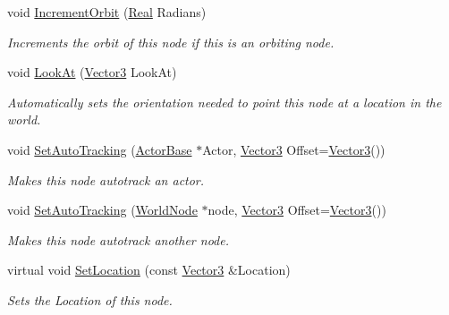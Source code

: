 \begin{DoxyCompactItemize}
void \hyperlink{classMezzanine_1_1WorldNode_a4d09b9262a3d8a4e18bb0ffb5a8eeb2b}{IncrementOrbit} (\hyperlink{namespaceMezzanine_a726731b1a7df72bf3583e4a97282c6f6}{Real} Radians)
\begin{DoxyCompactList}\small\item\em Increments the orbit of this node if this is an orbiting node. \item\end{DoxyCompactList}\item 
void \hyperlink{classMezzanine_1_1WorldNode_abddad51fbb7f9e51410e9eda8ba633a3}{LookAt} (\hyperlink{classMezzanine_1_1Vector3}{Vector3} LookAt)
\begin{DoxyCompactList}\small\item\em Automatically sets the orientation needed to point this node at a location in the world. \item\end{DoxyCompactList}\item 
void \hyperlink{classMezzanine_1_1WorldNode_a085837f737b8932857eb96cdd748705e}{SetAutoTracking} (\hyperlink{classMezzanine_1_1ActorBase}{ActorBase} $\ast$Actor, \hyperlink{classMezzanine_1_1Vector3}{Vector3} Offset=\hyperlink{classMezzanine_1_1Vector3}{Vector3}())
\begin{DoxyCompactList}\small\item\em Makes this node autotrack an actor. \item\end{DoxyCompactList}\item 
void \hyperlink{classMezzanine_1_1WorldNode_accb11fd94c98482d5d1b28894a1f4d9b}{SetAutoTracking} (\hyperlink{classMezzanine_1_1WorldNode}{WorldNode} $\ast$node, \hyperlink{classMezzanine_1_1Vector3}{Vector3} Offset=\hyperlink{classMezzanine_1_1Vector3}{Vector3}())
\begin{DoxyCompactList}\small\item\em Makes this node autotrack another node. \item\end{DoxyCompactList}\item 
virtual void \hyperlink{classMezzanine_1_1WorldNode_a636852458b226f1c2f3089f17558e678}{SetLocation} (const \hyperlink{classMezzanine_1_1Vector3}{Vector3} \&Location)
\begin{DoxyCompactList}\small\item\em Sets the Location of this node. \item\end{DoxyCompactList}\item 

\end{DoxyCompactItemize}
